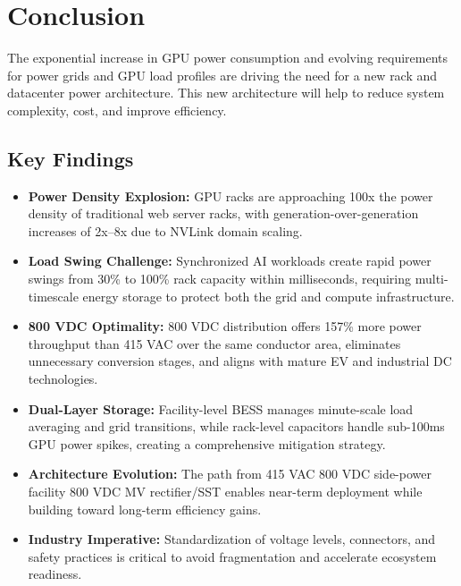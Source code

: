 \section{Conclusion}

The exponential increase in GPU power consumption and evolving requirements for power grids and GPU load profiles are driving the need for a new rack and datacenter power architecture. This new architecture will help to reduce system complexity, cost, and improve efficiency.

\subsection*{Key Findings}

\begin{itemize}
\item \textbf{Power Density Explosion:} GPU racks are approaching 100x the power density of traditional web server racks, with generation-over-generation increases of 2x--8x due to NVLink domain scaling.

\item \textbf{Load Swing Challenge:} Synchronized AI workloads create rapid power swings from 30\% to 100\% rack capacity within milliseconds, requiring multi-timescale energy storage to protect both the grid and compute infrastructure.

\item \textbf{800 VDC Optimality:} 800 VDC distribution offers 157\% more power throughput than 415 VAC over the same conductor area, eliminates unnecessary conversion stages, and aligns with mature EV and industrial DC technologies.

\item \textbf{Dual-Layer Storage:} Facility-level BESS manages minute-scale load averaging and grid transitions, while rack-level capacitors handle sub-100ms GPU power spikes, creating a comprehensive mitigation strategy.

\item \textbf{Architecture Evolution:} The path from 415 VAC \textrightarrow{} 800 VDC side-power \textrightarrow{} facility 800 VDC \textrightarrow{} MV rectifier/SST enables near-term deployment while building toward long-term efficiency gains.

\item \textbf{Industry Imperative:} Standardization of voltage levels, connectors, and safety practices is critical to avoid fragmentation and accelerate ecosystem readiness.
\end{itemize}

